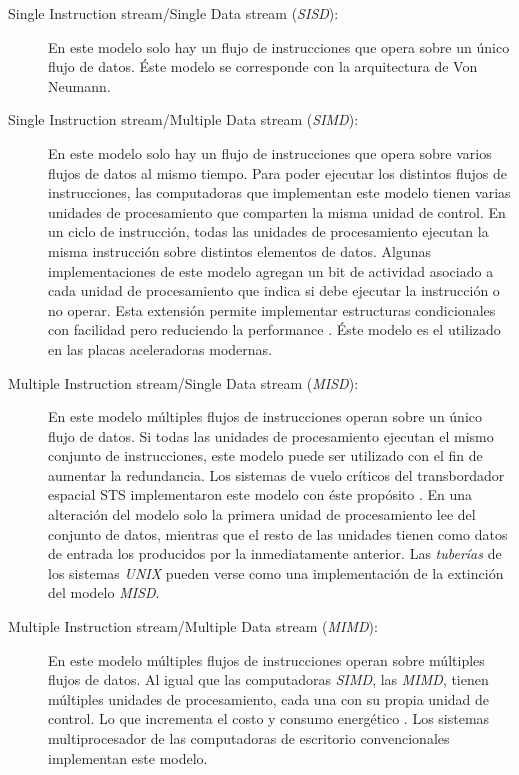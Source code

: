 \begin{description}

	\item[Single Instruction stream/Single Data stream (\emph{SISD}):] En
		este modelo solo hay un flujo de instrucciones que opera sobre
		un único flujo de datos. Éste modelo se corresponde con la
		arquitectura de Von Neumann.

	\item[Single Instruction stream/Multiple Data stream (\emph{SIMD}):] En
		este modelo solo hay un flujo de instrucciones que opera sobre
		varios flujos de datos al mismo tiempo. Para poder ejecutar los
		distintos flujos de instrucciones, las computadoras que
		implementan este modelo tienen varias unidades de procesamiento
		que comparten la misma unidad de control. En un ciclo de
		instrucción, todas las unidades de procesamiento ejecutan la
		misma instrucción sobre distintos elementos de datos. Algunas
		implementaciones de este modelo agregan un bit de actividad
		asociado a cada unidad de procesamiento que indica si debe
		ejecutar la instrucción o no operar. Esta extensión permite
		implementar estructuras condicionales con facilidad pero
		reduciendo la performance \cite{introToPC2002}. Éste modelo es
		el utilizado en las placas aceleradoras modernas.

	\item[Multiple Instruction stream/Single Data stream (\emph{MISD}):] En
		este modelo múltiples flujos de instrucciones operan sobre un
		único flujo de datos. Si todas las unidades de procesamiento
		ejecutan el mismo conjunto de instrucciones, este modelo puede
		ser utilizado con el fin de aumentar la redundancia. Los
		sistemas de vuelo críticos del transbordador espacial STS
		implementaron este modelo con éste propósito
		\cite{spaceShuttlePCS1984}. En una alteración del modelo solo la
		primera unidad de procesamiento lee del conjunto de datos,
		mientras que el resto de las unidades tienen como datos de
		entrada los producidos por la inmediatamente anterior. Las
		\emph{tuberías} de los sistemas \emph{UNIX} pueden verse como
		una implementación de la extinción del modelo \emph{MISD}.

	\item[Multiple Instruction stream/Multiple Data stream (\emph{MIMD}):] En
		este modelo múltiples flujos de instrucciones operan sobre
		múltiples flujos de datos. Al igual que las computadoras
		\emph{SIMD}, las \emph{MIMD}, tienen múltiples unidades de
		procesamiento, cada una con su propia unidad de control.
		Lo que incrementa el costo y consumo energético
		\cite{introToPC2002}. Los sistemas multiprocesador de las
		computadoras de escritorio convencionales implementan este
		modelo.

\end{description}

